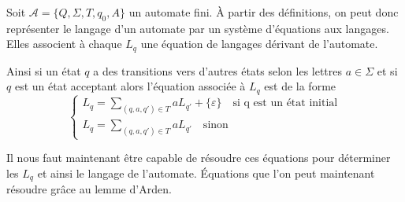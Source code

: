\begin{proposition}
    Soit $ \mathcal{A} = \{Q, \Sigma, T, q_0, A\}$ un automate fini.
    À partir des définitions, on peut donc représenter le langage d'un automate par un système d'équations aux langages. 
    Elles associent à chaque $L_q$ une équation de langages dérivant de l'automate. 
    
    \vspace{0.2cm}
    
    Ainsi si un état $q$ a des transitions vers d'autres états selon les lettres $a \in \Sigma$ et si $q$ est un état 
    acceptant alors l'équation associée à $L_q$ est de la forme 
        \[ 
            \begin{cases}
                L_q = \sum_{(q,a,q') \in T} a L_{q'} + \{\varepsilon\}  \quad \text{si q est un état initial} \\ 
                L_q = \sum_{(q,a,q') \in T} a L_{q'} \quad \text{sinon}
            \end{cases}
        \] 
\end{proposition}

Il nous faut maintenant être capable de résoudre ces équations pour déterminer les $L_q$ et ainsi le langage de l'automate. 
Équations que l'on peut maintenant résoudre grâce au lemme d'Arden. 

